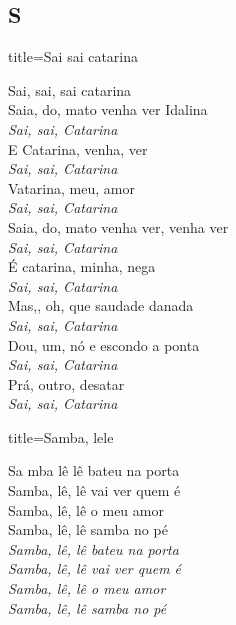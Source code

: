 \documentclass[fontsize=14pt, paper=a4, twoside, DIV=20]{scrreprt} %
\newcommand\chapTOC[1]{
    \chapter*{#1}
    \addcontentsline{toc}{chapter}{#1}
    \markboth{#1}{#1}}
\begin{document}
\begin{multicols*}{2}
\chapTOC{S}

\begin{song}{title={Sai sai catarina}}
        \begin{verse*}
            Sai, sai, sai catarina\\
            Saia, do, mato venha ver Idalina\\
            \textit{Sai, sai, Catarina}\\
            E Catarina, venha, ver\\
            \textit{Sai, sai, Catarina}\\
            Vatarina, meu, amor\\
            \textit{Sai, sai, Catarina}\\
            Saia, do, mato venha ver, venha ver\\
            \textit{Sai, sai, Catarina}\\
            É catarina, minha, nega\\
            \textit{Sai, sai, Catarina}\\
            Mas,, oh, que saudade danada\\
            \textit{Sai, sai, Catarina}\\
            Dou, um, nó e escondo a ponta\\
            \textit{Sai, sai, Catarina}\\
            Prá, outro, desatar\\
            \textit{Sai, sai, Catarina}\\
        \end{verse*}
\end{song}

\begin{song}{title={Samba, lele}}
        \begin{verse*}
        Sa mba lê lê bateu na porta\\
        Samba, lê, lê vai ver quem é\\
        Samba, lê, lê o meu amor\\
        Samba, lê, lê samba no pé\\
        \textit{Samba, lê, lê bateu na porta}\\
        \textit{Samba, lê, lê vai ver quem é}\\
        \textit{Samba, lê, lê o meu amor}\\
        \textit{Samba, lê, lê samba no pé}\\
    \end{verse*}


\end{song}
\end{multicols*}
\end{document}
